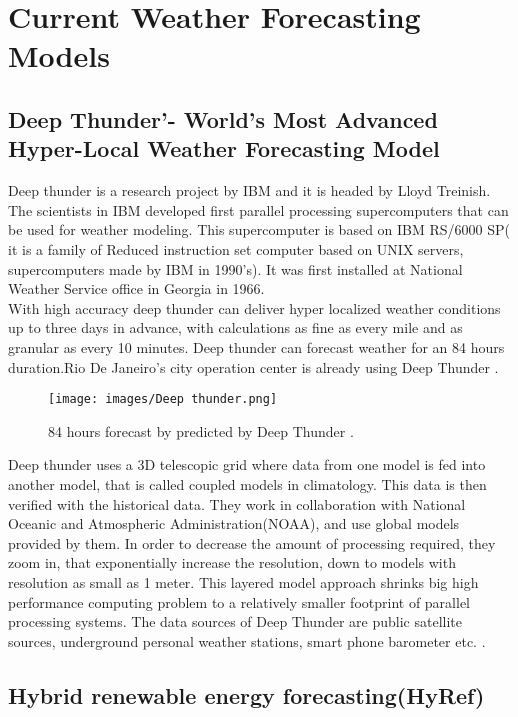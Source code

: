 \documentclass[sigconf]{acmart}
\begin{document}
\section{Current Weather Forecasting Models}



\subsection{Deep Thunder'-  World's Most Advanced Hyper-Local Weather Forecasting Model}


Deep thunder is a research project by IBM and it is headed by Lloyd Treinish. The scientists in IBM developed first parallel processing supercomputers that can be used for weather modeling. This supercomputer is based on IBM RS/6000 SP( it is a family of Reduced instruction set computer based on UNIX servers, supercomputers made by IBM in 1990's). It was first installed at National Weather Service office in Georgia in 1966.\\
With high accuracy deep thunder can deliver hyper localized weather conditions up to three days in advance, with calculations as fine as every mile and as granular as every 10 minutes. Deep thunder can forecast weather for an 84 hours duration.Rio De Janeiro's city operation center is already using Deep Thunder \cite{Coclus01}.


\begin{figure}
\texttt{[image: images/Deep thunder.png]}
\caption{84 hours forecast by predicted by Deep Thunder \cite{Image}.}
\end{figure}

Deep thunder uses a 3D telescopic grid where data from one model is fed into another model, that is called coupled models in climatology. This data is then verified with the historical data. They work in collaboration with National Oceanic and Atmospheric Administration(NOAA), and use global models provided by them. In order to decrease the amount of processing required, they zoom in, that exponentially increase the resolution, down to models with resolution as small as 1 meter. This layered model approach shrinks big high performance computing problem to a relatively smaller footprint of parallel processing systems. The data sources of Deep Thunder are public satellite sources, underground personal weather stations, smart phone barometer etc.  \cite{Deep01}.


\subsection{Hybrid renewable energy forecasting(HyRef)}
\end{document}
